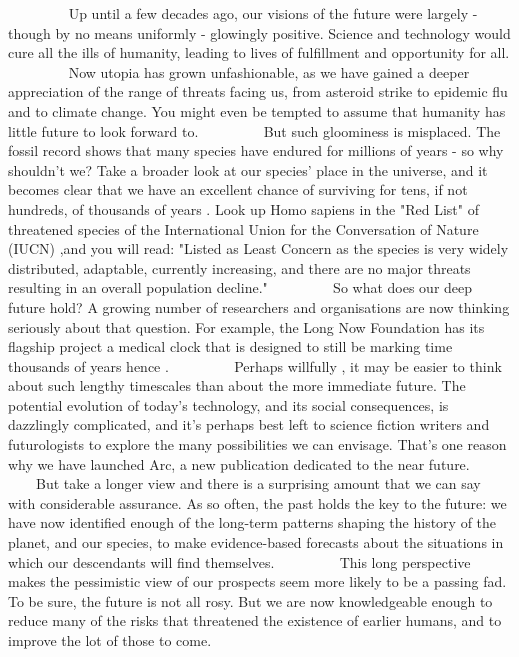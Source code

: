     
    Up until a few decades ago, our visions of the future were largely - though by no means uniformly - glowingly positive. Science and technology would cure all the ills of humanity, leading to lives of fulfillment and opportunity for all.
    
    Now utopia has grown unfashionable, as we have gained a deeper appreciation of the range of threats facing us, from asteroid strike to epidemic flu and to climate change. You might even be tempted to assume that humanity has little future to look forward to.
    
    But such gloominess is misplaced. The fossil record shows that many species have endured for millions of years - so why shouldn't we? Take a broader look at our species' place in the universe, and it becomes clear that we have an excellent chance of surviving for tens, if not hundreds, of thousands of years . Look up Homo sapiens in the "Red List" of threatened species of the International Union for the Conversation of Nature (IUCN) ,and you will read: "Listed as Least Concern as the species is very widely distributed, adaptable, currently increasing, and there are no major threats resulting in an overall population decline."
    
    So what does our deep future hold? A growing number of researchers and organisations are now thinking seriously about that question. For example, the Long Now Foundation has its flagship project a medical clock that is designed to still be marking time thousands of years hence .
    
    Perhaps willfully , it may be easier to think about such lengthy timescales than about the more immediate future. The potential evolution of today's technology, and its social consequences, is dazzlingly complicated, and it's perhaps best left to science fiction writers and futurologists to explore the many possibilities we can envisage. That's one reason why we have launched Arc, a new publication dedicated to the near future.
    
    But take a longer view and there is a surprising amount that we can say with considerable assurance. As so often, the past holds the key to the future: we have now identified enough of the long-term patterns shaping the history of the planet, and our species, to make evidence-based forecasts about the situations in which our descendants will find themselves.
    
    This long perspective makes the pessimistic view of our prospects seem more likely to be a passing fad. To be sure, the future is not all rosy. But we are now knowledgeable enough to reduce many of the risks that threatened the existence of earlier humans, and to improve the lot of those to come.
    

